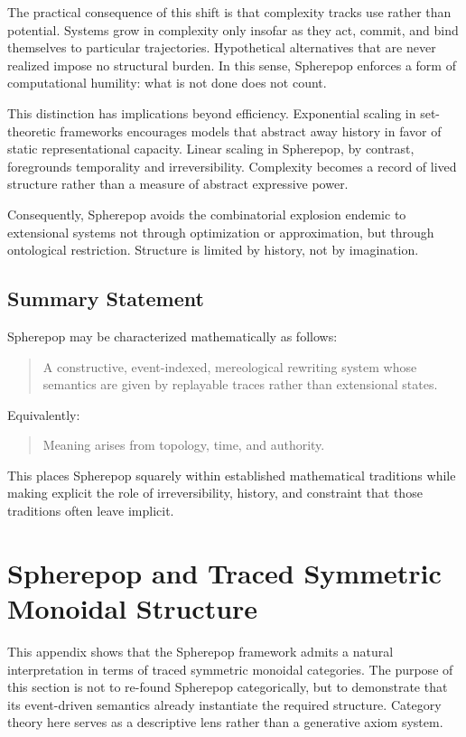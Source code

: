\documentclass[11pt]{article}
\begin{document}
The practical consequence of this shift is that complexity tracks use rather than potential. Systems grow in complexity only insofar as they act, commit, and bind themselves to particular trajectories. Hypothetical alternatives that are never realized impose no structural burden. In this sense, Spherepop enforces a form of computational humility: what is not done does not count.

This distinction has implications beyond efficiency. Exponential scaling in set-theoretic frameworks encourages models that abstract away history in favor of static representational capacity. Linear scaling in Spherepop, by contrast, foregrounds temporality and irreversibility. Complexity becomes a record of lived structure rather than a measure of abstract expressive power.

Consequently, Spherepop avoids the combinatorial explosion endemic to extensional systems not through optimization or approximation, but through ontological restriction. Structure is limited by history, not by imagination.


\subsection{Summary Statement}

Spherepop may be characterized mathematically as follows:

\begin{quote}
A constructive, event-indexed, mereological rewriting system whose semantics are given by replayable traces rather than extensional states.
\end{quote}

Equivalently:
\begin{quote}
Meaning arises from topology, time, and authority.
\end{quote}

This places Spherepop squarely within established mathematical traditions while making explicit the role of irreversibility, history, and constraint that those traditions often leave implicit.

\section{Spherepop and Traced Symmetric Monoidal Structure}

This appendix shows that the Spherepop framework admits a natural interpretation in terms of traced symmetric monoidal categories. The purpose of this section is not to re-found Spherepop categorically, but to demonstrate that its event-driven semantics already instantiate the required structure. Category theory here serves as a descriptive lens rather than a generative axiom system.
\end{document}
